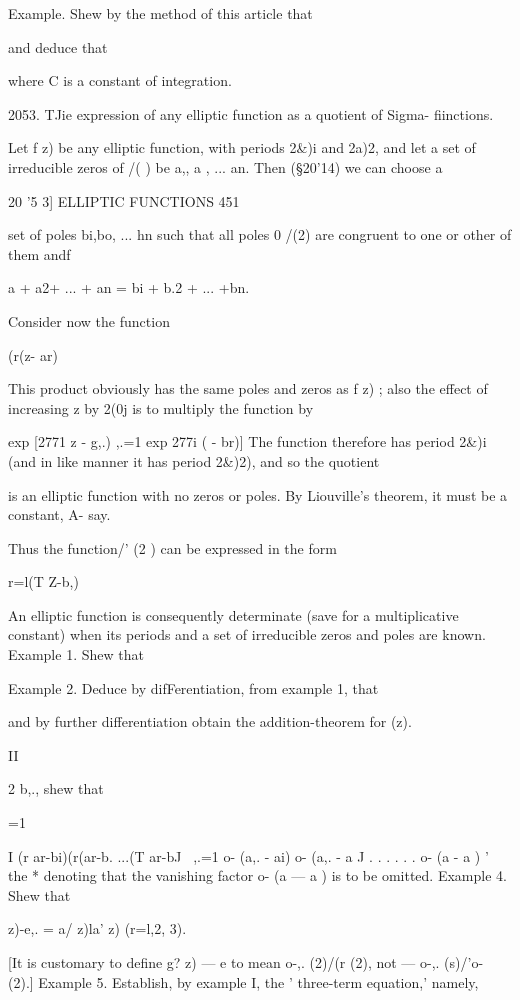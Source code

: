 {Example. Shew by the method of this article that

and deduce that

where C is a constant of integration.

2053. TJie expression of any elliptic function as a quotient of Sigma-
fiinctions.

Let f z) be any elliptic function, with periods 2\&)i and 2a)2, and
let a set of irreducible zeros of /( ) be a,, a , ... an. Then
(§20'14) we can choose a



20 '5 3] ELLIPTIC FUNCTIONS 451

set of poles bi,bo, ... hn such that all poles 0 /(2) are congruent to
one or other of them andf

a + a2+ ... + an = bi + b.2 + ... +bn.

Consider now the function

  (r(z- ar)

This product obviously has the same poles and zeros as f z) ; also the
effect of increasing z by 2(0j is to multiply the function by

  exp [2771 z - g,.) ,.=1 exp 277i ( - br)] The function therefore has
period 2\&)i (and in like manner it has period 2\&)2), and so the
quotient

is an elliptic function with no zeros or poles. By Liouville's
theorem, it must be a constant, A- say.

Thus the function/' (2 ) can be expressed in the form

r=l(T Z-b,)

An elliptic function is consequently determinate (save for a
multiplicative constant) when its periods and a set of irreducible
zeros and poles are known. Example 1. Shew that

Example 2. Deduce by difFerentiation, from example 1, that

and by further differentiation obtain the addition-theorem for (z).

II

2 b,., shew that

=1

I (r ar-bi)(r(ar-b. ...(T ar-bJ \ ,.=1 o- (a,. - ai) o- (a,. - a J . .
. . . . o- (a - a ) ' the * denoting that the vanishing factor o- (a —
a ) is to be omitted. Example 4. Shew that

  z)-e,. = a/ z)la' z) (r=l,2, 3).

[It is customary to define g? z) — e to mean o-,. (2)/(r (2), not —
o-,. (s)/'o- (2).] Example 5. Establish, by example I, the '
three-term equation,' namely,

}
